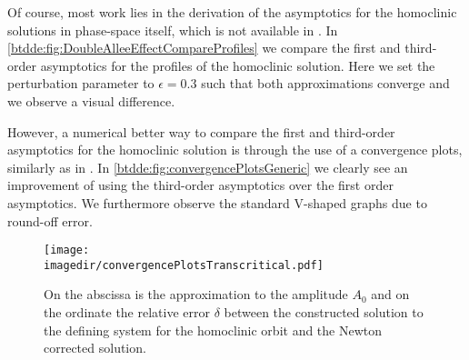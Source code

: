 Of course, most work lies in the derivation of the asymptotics for the
homoclinic solutions in phase-space itself, which is not available in
\cite{Jiao2021}. In  \cref{btdde:fig:DoubleAlleeEffectCompareProfiles} we compare the
first and third-order asymptotics for the profiles of the homoclinic solution.
Here we set the perturbation parameter to $\epsilon=0.3$ such that both
approximations converge and we observe a visual difference.

However, a numerical better way to compare the first and third-order
asymptotics for the homoclinic solution is through the use of a convergence
plots, similarly as in \cite{Bosschaert@Interplay}. In
\cref{btdde:fig:convergencePlotsGeneric} we clearly see an improvement of using the
third-order asymptotics over the first order asymptotics. We furthermore
observe the standard V-shaped graphs due to round-off error.
\begin{figure}[ht]
    \texttt{[image: \\imagedir/convergencePlotsTranscritical.pdf]}
    \caption{On the abscissa is the approximation to the amplitude $A_0$ and on
        the ordinate the relative error $\delta$ between the constructed solution
        to the defining system for the homoclinic orbit
        and the Newton corrected solution.}
    \label{btdde:fig:convergencePlotsTranscritical}
\end{figure}


